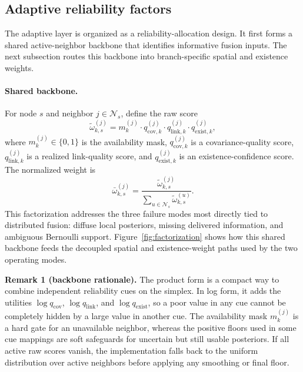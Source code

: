 \subsection{Adaptive reliability factors}

The adaptive layer is organized as a reliability-allocation design. It first forms a shared active-neighbor backbone that identifies informative fusion inputs. The next subsection routes this backbone into branch-specific spatial and existence weights.

\paragraph{Shared backbone.}
For node $s$ and neighbor $j \in \mathcal{N}_s$, define the raw score
\begin{equation}
\tilde{\omega}_{k,s}^{(j)} =
m_k^{(j)}
\cdot
q_{\mathrm{cov},k}^{(j)}
\cdot
q_{\mathrm{link},k}^{(j)}
\cdot
q_{\mathrm{exist},k}^{(j)},
\end{equation}
where $m_k^{(j)} \in \{0,1\}$ is the availability mask, $q_{\mathrm{cov},k}^{(j)}$ is a covariance-quality score, $q_{\mathrm{link},k}^{(j)}$ is a realized link-quality score, and $q_{\mathrm{exist},k}^{(j)}$ is an existence-confidence score. The normalized weight is
\begin{equation}
\bar{\omega}_{k,s}^{(j)} =
\frac{\tilde{\omega}_{k,s}^{(j)}}{\sum_{u \in \mathcal{N}_s}\tilde{\omega}_{k,s}^{(u)}}.
\end{equation}
This factorization addresses the three failure modes most directly tied to distributed fusion: diffuse local posteriors, missing delivered information, and ambiguous Bernoulli support. Figure~\ref{fig:factorization} shows how this shared backbone feeds the decoupled spatial and existence-weight paths used by the two operating modes.

\noindent\textbf{Remark 1 (backbone rationale).}
The product form is a compact way to combine independent reliability cues on the simplex. In log form, it adds the utilities $\log q_{\mathrm{cov}}$, $\log q_{\mathrm{link}}$, and $\log q_{\mathrm{exist}}$, so a poor value in any cue cannot be completely hidden by a large value in another cue. The availability mask $m_k^{(j)}$ is a hard gate for an unavailable neighbor, whereas the positive floors used in some cue mappings are soft safeguards for uncertain but still usable posteriors. If all active raw scores vanish, the implementation falls back to the uniform distribution over active neighbors before applying any smoothing or final floor.

